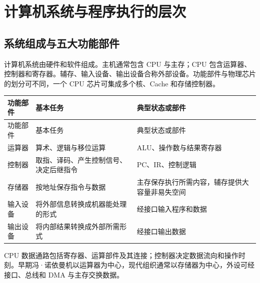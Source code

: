 \chapter{计算机系统与程序执行的层次}\label{CO01}

\section{系统组成与五大功能部件}\label{CO01-components}

计算机系统由硬件和软件组成。主机通常包含 CPU 与主存；CPU 包含运算器、控制器和寄存器。辅存、输入设备、输出设备合称外部设备。功能部件与物理芯片的划分可不同，一个 CPU 芯片可集成多个核、Cache 和存储控制器。

\par\smallskip
\begin{wideblock}
{\fontsize{9.3}{12}\selectfont\setlength{\tabcolsep}{2.5pt}\setlength{\LTleft}{0pt}\setlength{\LTright}{0pt}
\begin{longtable}{@{}>{\raggedright\arraybackslash}p{}>{\raggedright\arraybackslash}p{}>{\raggedright\arraybackslash}p{}@{}}
\toprule
功能部件 & 基本任务 & 典型状态或部件 \\

\midrule\endfirsthead\toprule
功能部件 & 基本任务 & 典型状态或部件 \\

\midrule\endhead\bottomrule\endfoot
运算器 & 算术、逻辑与移位运算 & ALU、操作数与结果寄存器 \\

控制器 & 取指、译码、产生控制信号、决定后继指令 & PC、IR、控制逻辑 \\

存储器 & 按地址保存指令与数据 & 主存保存执行所需内容，辅存提供大容量非易失空间 \\

输入设备 & 将外部信息转换成机器能处理的形式 & 经接口输入程序和数据 \\

输出设备 & 将内部结果转换成外部所需形式 & 经接口输出数据 \\

\end{longtable}}
\end{wideblock}
\par\smallskip

CPU 数据通路包括寄存器、运算部件及其连接；控制器决定数据流向和操作时刻。早期冯·诺依曼机以运算器为中心，现代组织通常以存储器为中心，外设可经接口、总线和 DMA 与主存交换数据。

